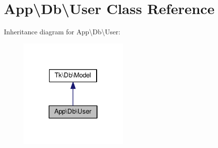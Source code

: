 \hypertarget{classApp_1_1Db_1_1User}{\section{App\textbackslash{}Db\textbackslash{}User Class Reference}
\label{classApp_1_1Db_1_1User}
}


Inheritance diagram for App\textbackslash{}Db\textbackslash{}User\+:\nopagebreak
\begin{figure}[H]
\begin{center}
\leavevmode
\includegraphics[width=154pt]{classApp_1_1Db_1_1User__inherit__graph}
\end{center}
\end{figure}
